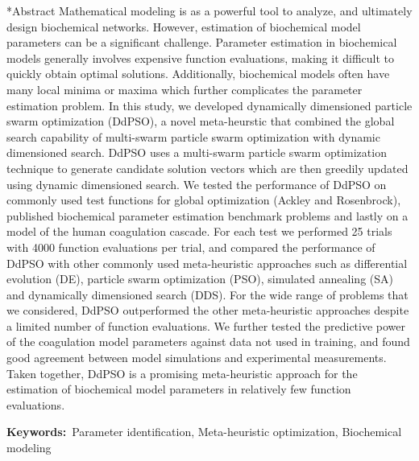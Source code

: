 \documentclass[12pt]{article}
\makeatletter
\renewcommand\section{\@startsection
	{subsection}{2}{0mm}
	{-0.2in}
	{0.05\baselineskip}
	{\normalfont\large\bfseries}}
\makeatother
\begin{document}
\section*{Abstract}
Mathematical modeling is as a powerful tool to analyze, and ultimately design biochemical networks.
However, estimation of biochemical model parameters can be a significant challenge.
Parameter estimation in biochemical models generally involves expensive function evaluations, making it difficult to quickly obtain optimal solutions.
Additionally, biochemical models often have many local minima or maxima which further complicates the parameter estimation problem.
In this study, we developed dynamically dimensioned particle swarm optimization (DdPSO), a novel meta-heurstic that combined the global search capability of multi-swarm particle swarm optimization with dynamic dimensioned search. DdPSO uses a multi-swarm particle swarm optimization technique to generate candidate solution vectors which are then greedily updated using dynamic dimensioned search. We tested the performance of DdPSO on commonly used test functions for global optimization (Ackley and Rosenbrock), published biochemical parameter estimation benchmark problems and
lastly on a model of the human coagulation cascade. For each test we performed 25 trials with 4000 function evaluations per trial, and compared the performance of DdPSO with other commonly
used meta-heuristic approaches such as differential evolution (DE), particle swarm optimization (PSO), simulated annealing (SA) and dynamically dimensioned search (DDS).
For the wide range of problems that we considered, DdPSO outperformed the other meta-heuristic approaches despite a limited number of function evaluations.
We further tested the predictive power of the coagulation model parameters against data not used in training, and found good agreement between model simulations and experimental measurements.
Taken together, DdPSO is a promising meta-heuristic approach for the estimation of biochemical model parameters in relatively few function evaluations.


{\noindent \textbf{Keywords:}~Parameter identification, Meta-heuristic optimization, Biochemical modeling}

\end{document}
